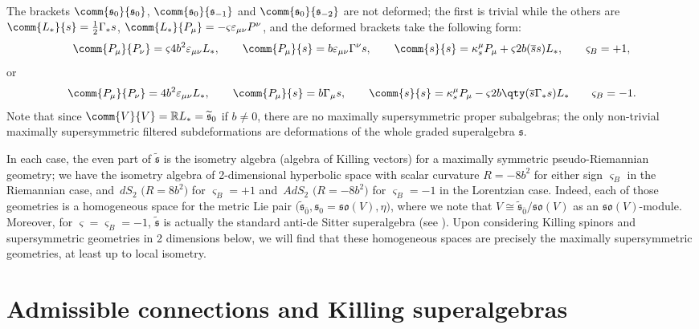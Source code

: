 \documentclass[10pt,a4paper]{amsart}
\numberwithin{equation}{section}
\newcommand{\fs}{\mathfrak{s}}
\newcommand{\fso}{\mathfrak{so}}
\newcommand{\RR}{\mathbb{R}}
\newcommand{\fstilde}{\widetilde{\fs}}
\newcommand{\1}{\mathbbm{1}}
\begin{document}
The brackets $\comm{\fs_0}{\fs_0}$, $\comm{\fs_0}{\fs_{-1}}$ and $\comm{\fs_0}{\fs_{-2}}$ are not deformed; the first is trivial while the others are
$\comm{L_*}{s} = \frac{1}{2}\Gamma_* s$,
$\comm{L_*}{P_\mu} = -\varsigma \varepsilon_{\mu\nu}P^\nu$,
and the deformed brackets take the following form:
\[%
	\comm{P_\mu}{P_\nu} = \varsigma 4b^2\varepsilon_{\mu\nu}L_*,	\qquad
	\comm{P_\mu}{s} = b\varepsilon_{\mu\nu}\Gamma^\nu s,	\qquad
	\comm{s}{s} = \kappa_s^\mu P_\mu + \varsigma 2b(\overline s s) L_*,	\qquad \varsigma_B=+1,
\]
or
\[%
	\comm{P_\mu}{P_\nu} = 4b^2\varepsilon_{\mu\nu}L_*,	\qquad
	\comm{P_\mu}{s} = b\Gamma_\mu s,	\qquad
	\comm{s}{s} = \kappa_s^\mu P_\mu - \varsigma 2b\qty(\overline s\Gamma_*s) L_*	\qquad \varsigma_B=-1.
\]
Note that since $\comm{V}{V}=\RR L_*=\fstilde_0$ if $b\neq 0$, there are no maximally supersymmetric proper subalgebras; the only non-trivial maximally supersymmetric filtered subdeformations are deformations of the whole graded superalgebra $\fs$.

In each case, the even part of $\fstilde$ is the isometry algebra (algebra of Killing vectors) for a maximally symmetric pseudo-Riemannian geometry; we have the isometry algebra of 2-dimensional hyperbolic space with scalar curvature $R=-8b^2$ for either sign $\varsigma_B$ in the Riemannian case, and~$dS_2$ $\bigl(R=8b^2\bigr)$ for $\varsigma_B=+1$ and~$AdS_2$ $\bigl(R=-8b^2\bigr)$ for $\varsigma_B=-1$ in the Lorentzian case. Indeed, each of those geometries is a homogeneous space for the metric Lie pair $\bigl(\fstilde_{\overline 0},\fs_0=\fso(V),\eta\bigr)$, where we note that $V\cong\fstilde_{\overline 0}/\fso(V)$ as an $\fso(V)$-module. Moreover, for $\varsigma=\varsigma_B=-1$, $\fstilde$ is actually the standard anti-de Sitter superalgebra (see \cite{VanProeyen1999}). Upon considering Killing spinors and supersymmetric geometries in 2 dimensions below, we will find that these homogeneous spaces are precisely the maximally supersymmetric geometries, at least up to local isometry.

\section{Admissible connections and Killing superalgebras}
\label{sec:2d-ksa}
\end{document}
